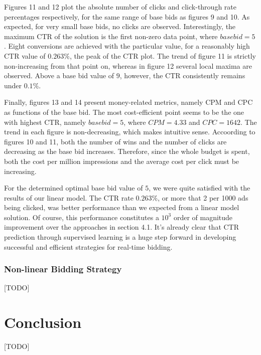 \documentclass{sig-alternate-05-2015}
\begin{document}
Figures 11 and 12 plot the absolute number of clicks and click-through rate percentages respectively, for the same range of base bids as figures 9 and 10. As expected, for very small base bids, no clicks are observed. Interestingly, the maximum CTR of the solution is the first non-zero data point, where $base bid = 5$. Eight conversions are achieved with the particular value, for a reasonably high CTR value of $0.263\%$, the peak of the CTR plot. The trend of figure 11 is strictly non-increasing from that point on, whereas in figure 12 several local maxima are observed. Above a base bid value of $9$, however, the CTR consistently remains under $0.1\%$.

Finally, figures 13 and 14 present money-related metrics, namely CPM and CPC as functions of the base bid. The most cost-efficient point seems to be the one with highest CTR, namely $base bid = 5$, where $CPM = 4.33$ and $CPC = 1642$. The trend in each figure is non-decreasing, which makes intuitive sense. Accoording to figures 10 and 11, both the number of wins and the number of clicks are decreasing as the base bid increases. Therefore, since the whole budget is spent, both the cost per million impressions and the average cost per click must be increasing.

For the determined optimal base bid value of $5$, we were quite satisfied with the results of our linear model. The CTR rate $0.263\%$, or more that 2 per 1000 ads being clicked, was better performance than we expected from a linear model solution. Of course, this performance constitutes a $10^3$ order of magnitude improvement over the approaches in section 4.1. It's already clear that CTR prediction through supervised learning is a huge step forward in developing successful and efficient strategies for real-time bidding.

\subsubsection{Non-linear Bidding Strategy}

[TODO]

\section{Conclusion}

[TODO]
\end{document}
